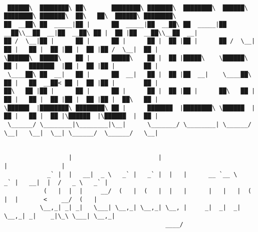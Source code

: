 \documentclass[varwidth=\maxdimen,margin=0.5cm,multi={verbatim}]{standalone}
\begin{document}
\begin{verbatim}

 ██████\  ████████\ ██\       ████████\ ███████\  ████████\  ██████\ ████████\ ███████\  ██\   ██\  ██████\ ████████\
██  __██\ ██  _____|██ |      ██  _____|██  __██\ ██  _____|██  __██\\__██  __|██  __██\ ██ |  ██ |██  __██\\__██  __|
██ /  \__|██ |      ██ |      ██ |      ██ |  ██ |██ |      ██ /  \__|  ██ |   ██ |  ██ |██ |  ██ |██ /  \__|  ██ |
\██████\  █████\    ██ |      █████\    ██ |  ██ |█████\    \██████\    ██ |   ███████  |██ |  ██ |██ |        ██ |
 \____██\ ██  __|   ██ |      ██  __|   ██ |  ██ |██  __|    \____██\   ██ |   ██  __██< ██ |  ██ |██ |        ██ |
██\   ██ |██ |      ██ |      ██ |      ██ |  ██ |██ |      ██\   ██ |  ██ |   ██ |  ██ |██ |  ██ |██ |  ██\   ██ |
\██████  |████████\ ████████\ ██ |      ███████  |████████\ \██████  |  ██ |   ██ |  ██ |\██████  |\██████  |  ██ |
 \______/ \________|\________|\__|      \_______/ \________| \______/   \__|   \__|  \__| \______/  \______/   \__|


                  |                        |                                     |               |
            _` |  |   __|  _ \   _` |   _` |  |   |      __ `__ \    _` |   __|  |  /   _ \   _` |
           (   |  |  |     __/  (   |  (   |  |   |      |   |   |  (   |  |       <    __/  (   |
          \__,_| _| _|   \___| \__,_| \__,_| \__, |     _|  _|  _| \__,_| _|    _|\_\ \___| \__,_|
                                             ____/



\end{verbatim}
\end{document}
